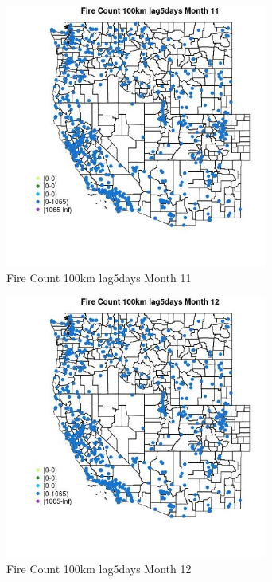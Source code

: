 \begin{figure} 
\centering  
\includegraphics[width=0.77\textwidth]{Code_Outputs/Report_ML_input_PM25_Step4_part_f_de_duplicated_aveswNAs_MapObsMo11Fire_Count_100km_lag5days.jpg} 
\caption{\label{fig:Report_ML_input_PM25_Step4_part_f_de_duplicated_aveswNAsMapObsMo11Fire_Count_100km_lag5days}Fire Count 100km lag5days Month 11} 
\end{figure} 
 

\begin{figure} 
\centering  
\includegraphics[width=0.77\textwidth]{Code_Outputs/Report_ML_input_PM25_Step4_part_f_de_duplicated_aveswNAs_MapObsMo12Fire_Count_100km_lag5days.jpg} 
\caption{\label{fig:Report_ML_input_PM25_Step4_part_f_de_duplicated_aveswNAsMapObsMo12Fire_Count_100km_lag5days}Fire Count 100km lag5days Month 12} 
\end{figure} 
 

